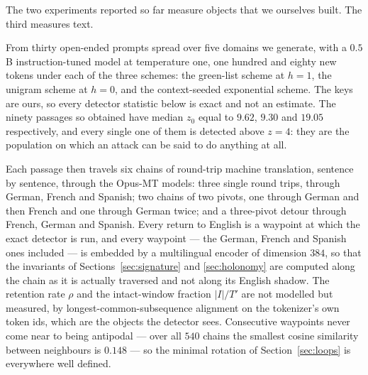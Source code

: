 \documentclass[11pt,a4paper]{article}
\theoremstyle{plain}
\theoremstyle{definition}
\numberwithin{equation}{section}
\begin{document}
The two experiments reported so far measure objects that we ourselves
built. The third measures text.

From thirty open-ended prompts spread over five domains we generate,
with a $0.5$B instruction-tuned model at temperature one, one hundred
and eighty new tokens under each of the three schemes: the green-list
scheme at $h=1$, the unigram scheme at $h=0$, and the context-seeded
exponential scheme. The keys are ours, so every detector statistic
below is exact and not an estimate. The ninety passages so obtained
have median $z_0$ equal to $9.62$, $9.30$ and $19.05$ respectively, and
every single one of them is detected above $z = 4$: they are the
population on which an attack can be said to do anything at all.

Each passage then travels six chains of round-trip machine translation,
sentence by sentence, through the Opus-MT models: three single round
trips, through German, French and Spanish; two chains of two pivots,
one through German and then French and one through German twice; and a
three-pivot detour through French, German and Spanish. Every return to
English is a waypoint at which the exact detector is run, and every
waypoint --- the German, French and Spanish ones included --- is
embedded by a multilingual encoder of dimension $384$, so that the
invariants of Sections~\ref{sec:signature} and \ref{sec:holonomy} are
computed along the chain as it is actually traversed and not along its
English shadow. The retention rate $\rho$ and the intact-window
fraction $|I|/T'$ are not modelled but measured, by
longest-common-subsequence alignment on the tokenizer's own token ids,
which are the objects the detector sees. Consecutive waypoints never
come near to being antipodal --- over all $540$ chains the smallest
cosine similarity between neighbours is $0.148$ --- so the minimal
rotation of Section~\ref{sec:loops} is everywhere well defined.
\end{document}
